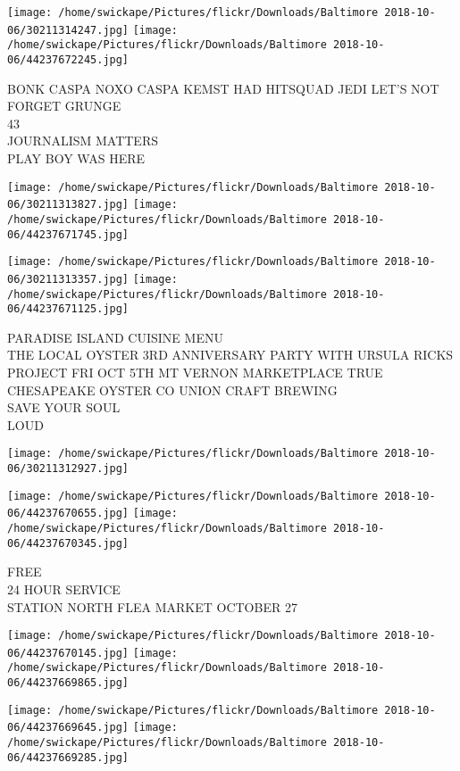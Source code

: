 \documentclass[10pt,letterpaper]{article}
\begin{document}
\texttt{[image: /home/swickape/Pictures/flickr/Downloads/Baltimore 2018-10-06/30211314247.jpg]}
\texttt{[image: /home/swickape/Pictures/flickr/Downloads/Baltimore 2018-10-06/44237672245.jpg]}

BONK CASPA NOXO CASPA KEMST HAD HITSQUAD JEDI LET'S NOT FORGET GRUNGE\\
43\\
JOURNALISM MATTERS\\
PLAY BOY WAS HERE\\
\pagebreak

\texttt{[image: /home/swickape/Pictures/flickr/Downloads/Baltimore 2018-10-06/30211313827.jpg]}
\texttt{[image: /home/swickape/Pictures/flickr/Downloads/Baltimore 2018-10-06/44237671745.jpg]}

\texttt{[image: /home/swickape/Pictures/flickr/Downloads/Baltimore 2018-10-06/30211313357.jpg]}
\texttt{[image: /home/swickape/Pictures/flickr/Downloads/Baltimore 2018-10-06/44237671125.jpg]}

PARADISE ISLAND CUISINE MENU\\
THE LOCAL OYSTER 3RD ANNIVERSARY PARTY WITH URSULA RICKS PROJECT FRI OCT 5TH MT VERNON MARKETPLACE TRUE CHESAPEAKE OYSTER CO UNION CRAFT BREWING\\
SAVE YOUR SOUL\\
LOUD\\
\pagebreak

\texttt{[image: /home/swickape/Pictures/flickr/Downloads/Baltimore 2018-10-06/30211312927.jpg]}

\vspace{0.25in}
\texttt{[image: /home/swickape/Pictures/flickr/Downloads/Baltimore 2018-10-06/44237670655.jpg]}
\texttt{[image: /home/swickape/Pictures/flickr/Downloads/Baltimore 2018-10-06/44237670345.jpg]}

FREE\\
24 HOUR SERVICE\\
STATION NORTH FLEA MARKET OCTOBER 27\\
\pagebreak

\texttt{[image: /home/swickape/Pictures/flickr/Downloads/Baltimore 2018-10-06/44237670145.jpg]}
\texttt{[image: /home/swickape/Pictures/flickr/Downloads/Baltimore 2018-10-06/44237669865.jpg]}

\texttt{[image: /home/swickape/Pictures/flickr/Downloads/Baltimore 2018-10-06/44237669645.jpg]}
\texttt{[image: /home/swickape/Pictures/flickr/Downloads/Baltimore 2018-10-06/44237669285.jpg]}
\end{document}
